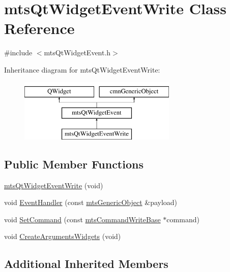 \hypertarget{classmts_qt_widget_event_write}{\section{mts\-Qt\-Widget\-Event\-Write Class Reference}
\label{classmts_qt_widget_event_write}
}


{\ttfamily \#include $<$mts\-Qt\-Widget\-Event.\-h$>$}

Inheritance diagram for mts\-Qt\-Widget\-Event\-Write\-:\begin{figure}[H]
\begin{center}
\leavevmode
\includegraphics[height=3.000000cm]{d9/d41/classmts_qt_widget_event_write}
\end{center}
\end{figure}
\subsection*{Public Member Functions}
\begin{DoxyCompactItemize}
\item 
\hyperlink{classmts_qt_widget_event_write_afd9af040e15dd686f4ff7657b0232586}{mts\-Qt\-Widget\-Event\-Write} (void)
\item 
void \hyperlink{classmts_qt_widget_event_write_a4fd99e17b7f4d9f87e25a5e6f9333712}{Event\-Handler} (const \hyperlink{classmts_generic_object}{mts\-Generic\-Object} \&payload)
\item 
void \hyperlink{classmts_qt_widget_event_write_a7a112b0fd30ffd94b5ef1df2ccb1484e}{Set\-Command} (const \hyperlink{classmts_command_write_base}{mts\-Command\-Write\-Base} $\ast$command)
\item 
void \hyperlink{classmts_qt_widget_event_write_af352ea320acc8ae8cb8ec514dc934d1a}{Create\-Arguments\-Widgets} (void)
\end{DoxyCompactItemize}
\subsection*{Additional Inherited Members}


